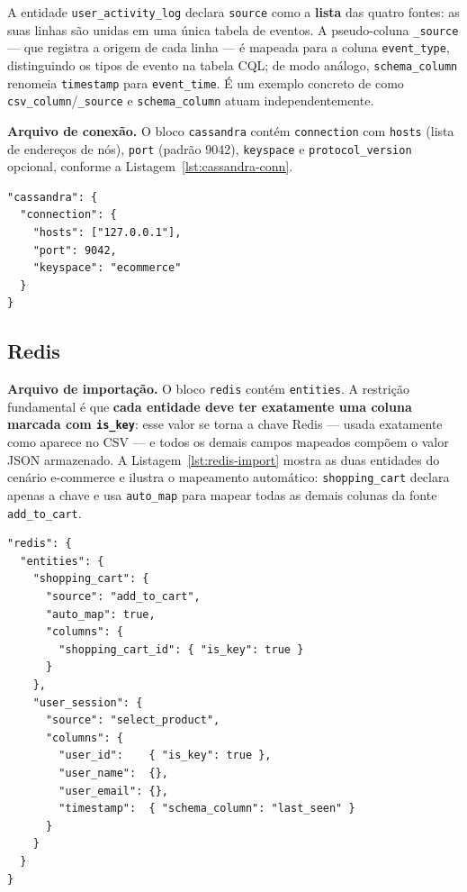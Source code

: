 A entidade \texttt{user\_activity\_log} declara \texttt{source} como a \textbf{lista} das
quatro fontes: as suas linhas são unidas em uma única tabela de eventos. A pseudo-coluna
\texttt{\_source} --- que registra a origem de cada linha --- é mapeada para a coluna
\texttt{event\_type}, distinguindo os tipos de evento na tabela CQL; de modo análogo,
\texttt{schema\_column} renomeia \texttt{timestamp} para \texttt{event\_time}. É um exemplo
concreto de como \texttt{csv\_column}/\texttt{\_source} e \texttt{schema\_column} atuam
independentemente.

\textbf{Arquivo de conexão.} O bloco \texttt{cassandra} contém \texttt{connection}
com \texttt{hosts} (lista de endereços de nós), \texttt{port} (padrão 9042),
\texttt{keyspace} e \texttt{protocol\_version} opcional, conforme a
Listagem~\ref{lst:cassandra-conn}.

\begin{lstlisting}[style=jsonstyle,caption={Fragmento de conexão Cassandra.},label={lst:cassandra-conn}]
"cassandra": {
  "connection": {
    "hosts": ["127.0.0.1"],
    "port": 9042,
    "keyspace": "ecommerce"
  }
}
\end{lstlisting}

\subsection{Redis}

\textbf{Arquivo de importação.} O bloco \texttt{redis} contém \texttt{entities}.
A restrição fundamental é que \textbf{cada entidade deve ter exatamente uma coluna
marcada com \texttt{is\_key}}: esse valor se torna a chave Redis --- usada exatamente
como aparece no CSV --- e todos os demais campos mapeados compõem o valor JSON
armazenado. A Listagem~\ref{lst:redis-import} mostra as duas entidades do cenário
e-commerce e ilustra o mapeamento automático: \texttt{shopping\_cart} declara apenas a
chave e usa \texttt{auto\_map} para mapear todas as demais colunas da fonte
\texttt{add\_to\_cart}.

\begin{lstlisting}[style=jsonstyle,caption={Fragmento de importação Redis (e-commerce), com mapeamento automático.},label={lst:redis-import}]
"redis": {
  "entities": {
    "shopping_cart": {
      "source": "add_to_cart",
      "auto_map": true,
      "columns": {
        "shopping_cart_id": { "is_key": true }
      }
    },
    "user_session": {
      "source": "select_product",
      "columns": {
        "user_id":    { "is_key": true },
        "user_name":  {},
        "user_email": {},
        "timestamp":  { "schema_column": "last_seen" }
      }
    }
  }
}
\end{lstlisting}

